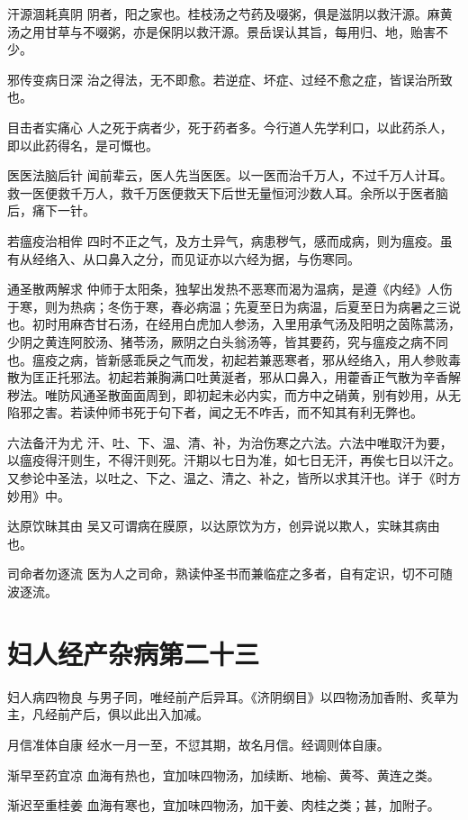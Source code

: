 \documentclass[a4paper,12pt,UTF8,twoside]{ctexbook}
\begin{document}
    汗源涸耗真阴
    阴者，阳之家也。桂枝汤之芍药及啜粥，俱是滋阴以救汗源。麻黄汤之用甘草与不啜粥，亦是保阴以救汗源。景岳误认其旨，每用归、地，贻害不少。
    
    邪传变病日深
    治之得法，无不即愈。若逆症、坏症、过经不愈之症，皆误治所致也。
    
    目击者实痛心
    人之死于病者少，死于药者多。今行道人先学利口，以此药杀人，即以此药得名，是可慨也。
    
    医医法脑后针
    闻前辈云，医人先当医医。以一医而治千万人，不过千万人计耳。救一医便救千万人，救千万医便救天下后世无量恒河沙数人耳。余所以于医者脑后，痛下一针。
    
    若瘟疫治相侔
    四时不正之气，及方土异气，病患秽气，感而成病，则为瘟疫。虽有从经络入、从口鼻入之分，而见证亦以六经为据，与伤寒同。
    
    通圣散两解求
    仲师于太阳条，独挈出发热不恶寒而渴为温病，是遵《内经》人伤于寒，则为热病；冬伤于寒，春必病温；先夏至日为病温，后夏至日为病暑之三说也。初时用麻杏甘石汤，在经用白虎加人参汤，入里用承气汤及阳明之茵陈蒿汤，少阴之黄连阿胶汤、猪苓汤，厥阴之白头翁汤等，皆其要药，究与瘟疫之病不同也。瘟疫之病，皆新感乖戾之气而发，初起若兼恶寒者，邪从经络入，用人参败毒散为匡正托邪法。初起若兼胸满口吐黄涎者，邪从口鼻入，用藿香正气散为辛香解秽法。唯防风通圣散面面周到，即初起未必内实，而方中之硝黄，别有妙用，从无陷邪之害。若读仲师书死于句下者，闻之无不咋舌，而不知其有利无弊也。
    
    六法备汗为尤
    汗、吐、下、温、清、补，为治伤寒之六法。六法中唯取汗为要，以瘟疫得汗则生，不得汗则死。汗期以七日为准，如七日无汗，再俟七日以汗之。又参论中圣法，以吐之、下之、温之、清之、补之，皆所以求其汗也。详于《时方妙用》中。
    
    达原饮昧其由
    吴又可谓病在膜原，以达原饮为方，创异说以欺人，实昧其病由也。
    
    司命者勿逐流
    医为人之司命，熟读仲圣书而兼临症之多者，自有定识，切不可随波逐流。
    \chapter{妇人经产杂病第二十三}
    妇人病四物良
    与男子同，唯经前产后异耳。《济阴纲目》以四物汤加香附、炙草为主，凡经前产后，俱以此出入加减。
    
    月信准体自康
    经水一月一至，不愆其期，故名月信。经调则体自康。
    
    渐早至药宜凉
    血海有热也，宜加味四物汤，加续断、地榆、黄芩、黄连之类。
    
    渐迟至重桂姜
    血海有寒也，宜加味四物汤，加干姜、肉桂之类；甚，加附子。
    
\end{document}

